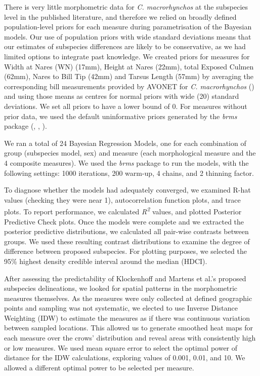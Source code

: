 \documentclass[10pt,a4paper]{article}
\begin{document}
There is very little morphometric data for \emph{C. macrorhynchos} at the subspecies level in the published literature, and therefore we relied on broadly defined population-level priors for each measure during parametrisation of the Bayesian models.
Our use of population priors with wide standard deviations means that our estimates of subspecies differences are likely to be conservative, as we had limited options to integrate past knowledge.
We created priors for measures for Width at Nares (WN) (17mm), Height at Nares (22mm), total Exposed Culmen (62mm), Nares to Bill Tip (42mm) and Tarsus Length (57mm) by averaging the corresponding bill measurements provided by AVONET for \emph{C. macrorhynchos} () and using those means as centres for normal priors with wide (20) standard deviations.
We set all priors to have a lower bound of 0.
For measures without prior data, we used the default uninformative priors generated by the \emph{brms} package (, , ).

We ran a total of 24 Bayesian Regression Models, one for each combination of group (subspecies model, sex) and measure (each morphological measure and the 4 composite measures).
We used the \emph{brms} package to run the models, with the following settings: 1000 iterations, 200 warm-up, 4 chains, and 2 thinning factor.

To diagnose whether the models had adequately converged, we examined R-hat values (checking they were near 1), autocorrelation function plots, and trace plots.
To report performance, we calculated \emph{R\textsuperscript{2}} values, and plotted Posterior Predictive Check plots.
Once the models were complete and we extracted the posterior predictive distributions, we calculated all pair-wise contrasts between groups.
We used these resulting contrast distributions to examine the degree of difference between proposed subspecies.
For plotting purposes, we selected the 95\% highest density credible interval around the median (HDCI).

After assessing the predictability of Klockenhoff and Martens et al.'s proposed subspecies delineations, we looked for spatial patterns in the morphometric measures themselves.
As the measures were only collected at defined geographic points and sampling was not systematic, we elected to use Inverse Distance Weighting (IDW) to estimate the measures as if there was continuous variation between sampled locations.
This allowed us to generate smoothed heat maps for each measure over the crows' distribution and reveal areas with consistently high or low measures.
We used mean square error to select the optimal power of distance for the IDW calculations, exploring values of 0.001, 0.01, and 10.
We allowed a different optimal power to be selected per measure.
\end{document}
